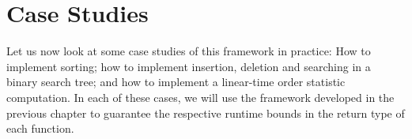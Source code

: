 
\chapter{Case Studies}
\label{ch:casestudiesdeterministic}
Let us now look at some case studies of this framework in practice: How to implement sorting; how to implement insertion, deletion and searching in a binary search tree; and how to implement a linear-time order statistic computation. In each of these cases, we will use the framework developed in the previous chapter to guarantee the respective runtime bounds in the return type of each function.



